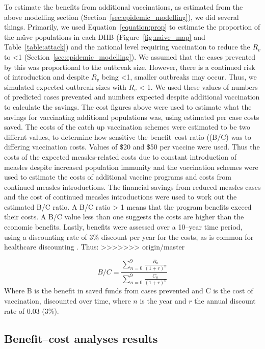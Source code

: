 \documentclass{article}
\begin{document}
\begin{itemize}
To estimate the benefits from additional vaccinations, as estimated from the above modelling section (Section~\ref{sec:epidemic_modelling}), we did several things. Primarily, we used Equation~\ref{equation:prop} to estimate the proportion of the na\"{\i}ve populations in each DHB (Figure~\ref{fig:naive_map} and Table~\ref{table:attack}) and the national level requiring vaccination to reduce the $R_v$ to <1 (Section~\ref{sec:epidemic_modelling}). We assumed that the cases prevented by this was proportional to the outbreak size. However, there is a continued risk of introduction and despite $R_v$ being <1, smaller outbreaks may occur. Thus, we simulated expected outbreak sizes with $R_v$ < 1. We used these values of numbers of predicted cases prevented and numbers expected despite additional vaccination to calculate the savings. The cost figures above were used to estimate what the savings for vaccinating additional populations was, using estimated per case costs saved. The costs of the catch up vaccination schemes were estimated to be two differnt values, to determine how sensitive the benefit--cost ratio ((B/C) was to differing vaccination costs. Values of \$20 and \$50 per vaccine were used. Thus the costs of the expected measles-related costs due to constant introduction of measles despite increased population immunity and the vaccination schemes were used to estimate the costs of additional vaccine programs and costs from continued measles introductions. The financial savings from reduced measles cases and the cost of continued measles introductions were used to work out the estimated B/C ratio. A B/C ratio > 1 means that the program benefits exceed their costs. A B/C value less than one suggests the costs are higher than the economic benefits. Lastly, benefits were assessed over a 10--year time period, using a discounting rate of 3\% discount per year for the costs, as is common for healthcare discounting \citep{honeycutt6}. Thus:
>>>>>>> origin/master

\begin{equation} \label{eq:bc}
 \textit{B/C} = \frac{\sum\limits_{n=0}^{9} \frac{B_n}{(1+r)^n}}{\sum\limits_{n=0}^{9} \frac{C_n}{(1+r)^n}}
 \end{equation}
Where B is the benefit in saved funds from cases prevented and C is the cost of vaccination, discounted over time, where $n$ is the year and $r$ the annual discount rate of 0.03 (3\%).

\subsection{Benefit--cost analyses results}


\end{itemize}
\end{document}
